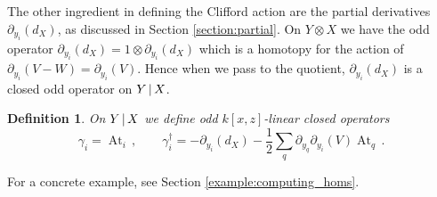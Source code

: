 \documentclass[english,letter paper,12pt,leqno]{article}
\theoremstyle{example}
\newtheorem{definition}[theorem]{Definition}
\numberwithin{equation}{section}
\def\ferm{\gamma}
\def\fermc{\gamma^\dagger}
\DeclareMathOperator{\At}{At}
\begin{document}
The other ingredient in defining the Clifford action are the partial derivatives $\partial_{y_i}(d_X)$, as discussed in Section \ref{section:partial}. On $Y \otimes X$ we have the odd operator $\partial_{y_i}(d_X) = 1 \otimes \partial_{y_i}(d_X)$ which is a homotopy for the action of $\partial_{y_i}(V - W) = \partial_{y_i}(V)$. Hence when we pass to the quotient, $\partial_{y_i}(d_X)$ is a closed odd operator on $Y \,|\, X$.

\begin{definition}\label{defn:cliffordaction_cut} On $Y \,|\, X$ we define odd $k[x,z]$-linear closed operators
\begin{equation}\label{eq:intro_clifford_act1}
\ferm_i = \At_i\,, \qquad \fermc_i = - \partial_{y_i}(d_X) - \frac{1}{2} \sum_q \partial_{y_q} \partial_{y_i}(V) \At_{q}\,.
\end{equation}
\end{definition}

For a concrete example, see Section \ref{example:computing_homs}.
\end{document}

